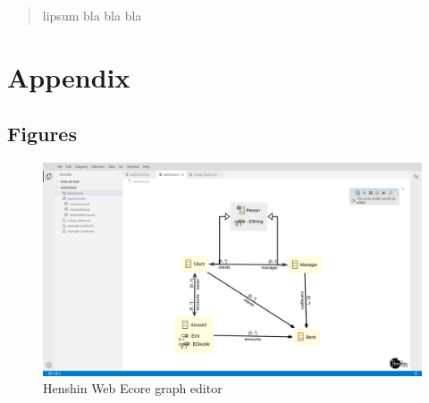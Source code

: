 \documentclass[conference,onecolumn]{IEEEtran}
\begin{document}
  

  \newpage

  \begin{abstract}
  lipsum bla bla bla
  \end{abstract}


  \IEEEpeerreviewmaketitle

    \newpage

 \tableofcontents
  \newpage

  

  

  

  

  

  

  

  

  

  

  \section{Appendix}
  \label{sec:appendix}

  \subsection{Figures}

  \begin{figure}[H]
    \centering
    \includegraphics[width=1\textwidth]{ecore-ui}
    \caption{Henshin Web Ecore graph editor}
    \label{fig:ecore-ui}
  \end{figure}
\end{document}
